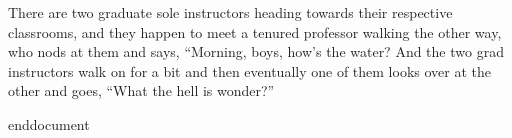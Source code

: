 \documentclass[letterpaper,notitlepage,12pt]{article}
\begin{document}
There are two graduate sole instructors heading towards their respective
classrooms, and they happen to meet a tenured professor walking the other way,
who nods at them and says, ``Morning, boys, how's the water? And the two grad
instructors walk on for a bit and then eventually one of them looks over at the
other and goes, ``What the hell is wonder?''

\nocite{plato_theaetetus_nodate}

\printbibliography

end{document}
\end{document}
